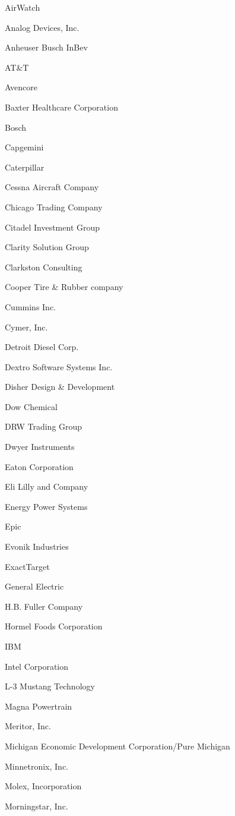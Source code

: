 \documentclass[twoside]{article}
\begin{document}
\begin{center}
\begin{multicols}{5}
\begin{FlushLeft}
\begin{compactitem}
\item AirWatch
\item Analog Devices, Inc.
\item Anheuser Busch InBev
\item AT\&T
\item Avencore
\item Baxter Healthcare Corporation
\item Bosch
\item Capgemini
\item Caterpillar
\item Cessna Aircraft Company
\item Chicago Trading Company
\item Citadel Investment Group
\item Clarity Solution Group
\item Clarkston Consulting
\item Cooper Tire \& Rubber company
\item Cummins Inc.
\item Cymer, Inc.
\item Detroit Diesel Corp.
\item Dextro Software Systems Inc.
\item Disher Design \& Development
\item Dow Chemical
\item DRW Trading Group
\item Dwyer Instruments
\item Eaton Corporation
\item Eli Lilly and Company
\item Energy Power Systems
\item Epic
\item Evonik Industries
\item ExactTarget
\item General Electric
\item H.B. Fuller Company
\item Hormel Foods Corporation
\item IBM
\item Intel Corporation
\item L-3 Mustang Technology
\item Magna Powertrain
\item Meritor, Inc.
\item Michigan Economic Development Corporation/Pure Michigan
\item Minnetronix, Inc.
\item Molex, Incorporation
\item Morningstar, Inc.

\end{compactitem}
\end{FlushLeft}
\end{multicols}
\end{center}
\end{document}
